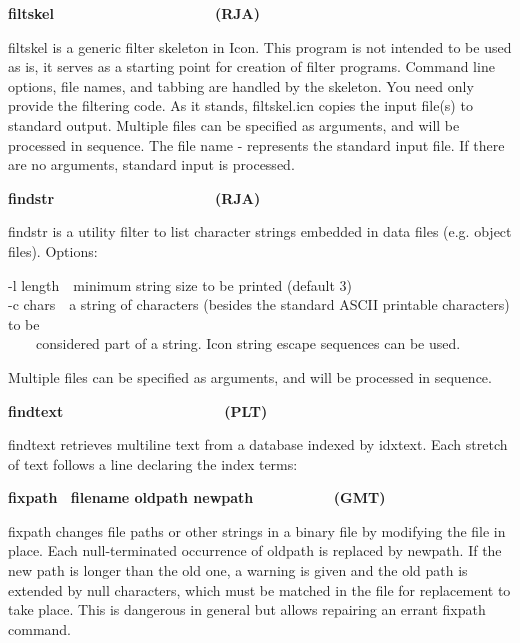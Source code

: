 {\sffamily\bfseries
filtskel\ \ \ \ \ \ \ \ \ \ \ \ \ \ \ \ \ \ \ \ (RJA)}

\textsf{filtskel} is a generic filter skeleton in Icon. This program is
not intended to be used as is, it serves as a starting point for
creation of filter programs. Command line options, file names, and
tabbing are handled by the skeleton. You need only provide the
filtering code. As it stands, \textsf{filtskel.icn} copies the input
file(s) to standard output. Multiple files can be specified as
arguments, and will be processed in sequence. The file name
\textsf{{\textquotedbl}-{\textquotedbl}} represents the standard input
file. If there are no arguments, standard input is processed.

{\sffamily\bfseries
findstr\ \ \ \ \ \ \ \ \ \ \ \ \ \ \ \ \ \ \ \ (RJA)}

\textsf{findstr} is a utility filter to list character strings embedded
in data files (e.g. object files). Options:

\textsf{{}-l length}\ \ minimum string size to be printed (default
3)\\
\textsf{{}-c chars}\ \ a string of characters (besides the standard
ASCII printable characters) to be\\
\ \ \ \ considered part of a string. Icon string escape sequences can be
used.

Multiple files can be specified as arguments, and will be processed in
sequence. 

{\sffamily\bfseries
findtext\ \ \ \ \ \ \ \ \ \ \ \ \ \ \ \ \ \ \ \ (PLT)}

\textsf{findtext} retrieves multiline text from a
database indexed by idxtext. Each stretch of text
follows a line declaring the index terms:






{\sffamily\bfseries
fixpath \ \textrm{\textmd{filename oldpath
newpath\ \ \ \ \ \ \ \ \ \ }}(GMT)}

\textsf{fixpath} changes file paths or other strings in a binary file by
modifying the file in place. Each null-terminated occurrence of
\textsf{oldpath} is replaced by \textsf{newpath}. If the new path is
longer than the old one, a warning is given and the old path is
extended by null characters, which must be matched in the file for
replacement to take place. This is dangerous in general but allows
repairing an errant fixpath command. 

